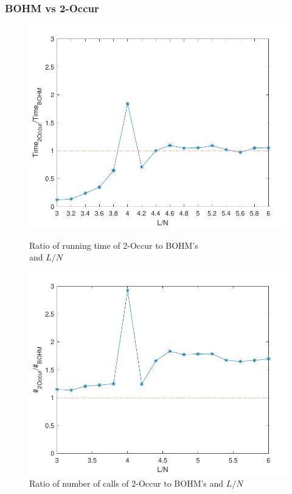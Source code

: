 \documentclass[12pt]{article}
\begin{document}
	\subsubsection{BOHM vs 2-Occur}
		\begin{figure}[t!h]
		\setlength{\leftskip}{0pt}
		\begin{minipage}[t]{0.5\textwidth}
			\centering
			\includegraphics[width=1.0\columnwidth,height=0.785\columnwidth]{tTvsB}
			\caption{Ratio of running time of 2-Occur to BOHM's\\ and $L/N$}
			\label{fig:ex-qa}
		\end{minipage}
		\begin{minipage}[t]{0.5\textwidth}
			\centering
			\includegraphics[width=1\columnwidth,height=0.785\columnwidth]{cTvsB}
			\caption{Ratio of number of calls  of 2-Occur to BOHM's and $L/N$}
			\label{fig:ex-sm}
		\end{minipage}
	\end{figure}
\end{document}

